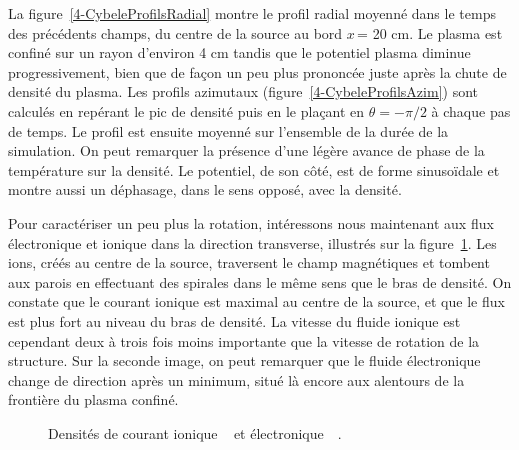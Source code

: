 \begin{refsection}
La figure~\ref{4-CybeleProfilsRadial} montre le profil radial moyenné dans le
temps des précédents champs, du centre de la source au bord $x\,$= 20 cm. Le
plasma est confiné sur un rayon d'environ 4 cm tandis que le potentiel plasma
diminue progressivement, bien que de façon un peu plus prononcée juste après la
chute de densité du plasma. 
Les profils azimutaux (figure~\ref{4-CybeleProfilsAzim})  sont calculés en
repérant le pic de densité puis en le plaçant en $\theta=-\pi/2$ à chaque pas de temps. Le profil
est ensuite moyenné sur l'ensemble de la durée de la simulation.
On peut remarquer la présence d'une légère avance de phase de la température
sur la densité. Le potentiel, de son côté, est de forme sinusoïdale et montre
aussi un déphasage, dans le sens opposé, avec la densité.

Pour caractériser un peu plus la rotation, intéressons nous
maintenant aux flux électronique et ionique dans la direction
transverse, illustrés sur la figure~\ref{4-CybeleCarteFlux}.
Les ions, créés au centre de la source, traversent le champ magnétiques et
tombent aux parois en effectuant des spirales dans le même sens que le bras de
densité. On constate que le courant ionique est maximal au centre de la source,
et que le flux est plus fort au niveau du bras de densité. La
vitesse du fluide ionique est cependant deux à trois fois moins importante que la vitesse de rotation de
la structure. Sur la seconde image, on peut remarquer que le fluide électronique
change de direction après un minimum, situé là encore aux alentours de la
frontière du plasma confiné.

\begin{figure}[!htbp]
  \centering
    \caption{Densités de courant ionique
    ~ et électronique~~.}
    \label{4-CybeleCarteFlux}
\end{figure}


\end{refsection}
